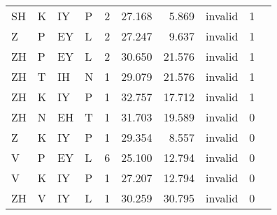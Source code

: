 \begin{longtable}{l@{ } l@{ } l@{ } l r r r r r r}
$$SH & K & IY & P & 2 & 27.168 & 5.869  & invalid & 1 \\
Z & P & EY & L  & 2 & 27.247 & 9.637  & invalid & 1 \\
ZH & P & EY & L & 2 & 30.650 & 21.576 & invalid & 1 \\
ZH & T & IH & N & 1 & 29.079 & 21.576 & invalid & 1 \\
ZH & K & IY & P & 1 & 32.757 & 17.712 & invalid & 1 \\
ZH & N & EH & T & 1 & 31.703 & 19.589 & invalid & 0 \\
Z & K & IY & P  & 1 & 29.354 & 8.557  & invalid & 0 \\
V & P & EY & L  & 6 & 25.100 & 12.794 & invalid & 0 \\
V & K & IY & P  & 1 & 27.207 & 12.794 & invalid & 0 \\
ZH & V & IY & L & 1 & 30.259 & 30.795 & invalid & 0 \\
\bottomrule
\end{longtable}
